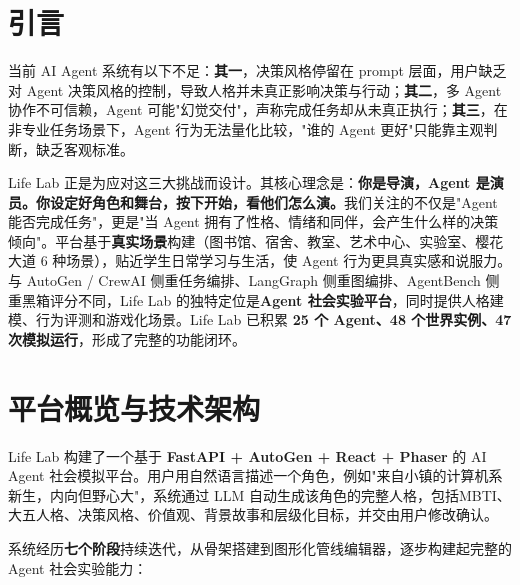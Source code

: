 \documentclass[12pt,a4paper]{article}%
\begin{document}
\newpage
\tableofcontents
	
\newpage

\section{引言}

当前 AI Agent 系统有以下不足：\textbf{其一}，决策风格停留在 prompt 层面，用户缺乏对 Agent 决策风格的控制，导致人格并未真正影响决策与行动；\textbf{其二}，多 Agent 协作不可信赖，Agent 可能"幻觉交付"，声称完成任务却从未真正执行；\textbf{其三}，在非专业任务场景下，Agent 行为无法量化比较，"谁的 Agent 更好"只能靠主观判断，缺乏客观标准。

Life Lab 正是为应对这三大挑战而设计。其核心理念是：\textbf{你是导演，Agent 是演员。你设定好角色和舞台，按下开始，看他们怎么演。}我们关注的不仅是"Agent 能否完成任务"，更是"当 Agent 拥有了性格、情绪和同伴，会产生什么样的决策倾向"。平台基于\textbf{真实场景}构建（图书馆、宿舍、教室、艺术中心、实验室、樱花大道 6 种场景），贴近学生日常学习与生活，使 Agent 行为更具真实感和说服力。与 AutoGen / CrewAI 侧重任务编排、LangGraph 侧重图编排、AgentBench 侧重黑箱评分不同，Life Lab 的独特定位是\textbf{Agent 社会实验平台}，同时提供人格建模、行为评测和游戏化场景。Life Lab 已积累 \textbf{25 个 Agent、48 个世界实例、47 次模拟运行}，形成了完整的功能闭环。

\section{平台概览与技术架构}

Life Lab 构建了一个基于 \textbf{FastAPI + AutoGen + React + Phaser} 的 AI Agent 社会模拟平台。用户用自然语言描述一个角色，例如"来自小镇的计算机系新生，内向但野心大"，系统通过 LLM 自动生成该角色的完整人格，包括MBTI、大五人格、决策风格、价值观、背景故事和层级化目标，并交由用户修改确认。

系统经历\textbf{七个阶段}持续迭代，从骨架搭建到图形化管线编辑器，逐步构建起完整的 Agent 社会实验能力：
\end{document}
